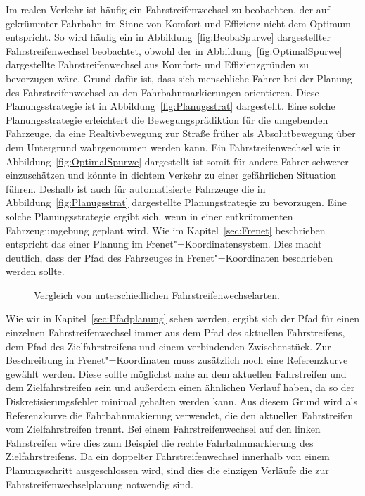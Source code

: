 Im realen Verkehr ist h\"aufig ein Fahrstreifenwechsel zu beobachten, der auf gekr\"ummter Fahrbahn im Sinne von Komfort und Effizienz nicht dem Optimum entspricht.
So wird h\"aufig ein in Abbildung~\ref{fig:BeobaSpurwe} dargestellter Fahrstreifenwechsel beobachtet, obwohl der in Abbildung~\ref{fig:OptimalSpurwe} dargestellte Fahrstreifenwechsel aus Komfort- und Effizienzgr\"unden zu bevorzugen w\"are.
Grund daf\"ur ist, dass sich menschliche Fahrer bei der Planung des Fahrstreifenwechsel an den Fahrbahnmarkierungen orientieren.
Diese Planungsstrategie ist in Abbildung~\ref{fig:Planugsstrat} dargestellt.
Eine solche Planungsstrategie erleichtert die Bewegungspr\"adiktion f\"ur die umgebenden Fahrzeuge, da eine Realtivbewegung zur Stra{\ss}e fr\"uher als Absolutbewegung \"uber dem Untergrund wahrgenommen werden kann.
Ein Fahrstreifenwechsel wie in Abbildung~\ref{fig:OptimalSpurwe} dargestellt ist somit f\"ur andere Fahrer schwerer einzusch\"atzen und k\"onnte in dichtem Verkehr zu einer gef\"ahrlichen Situation f\"uhren. 
Deshalb ist auch f\"ur automatisierte Fahrzeuge die in Abbildung~\ref{fig:Planugsstrat} dargestellte Planungstrategie zu bevorzugen.
Eine solche Planungsstrategie ergibt sich, wenn in einer entkr\"ummenten Fahrzeugumgebung geplant wird.
Wie im Kapitel~\ref{sec:Frenet} beschrieben entspricht das einer Planung im Frenet"=Koordinatensystem.
Dies macht deutlich, dass der Pfad des Fahrzeuges in Frenet"=Koordinaten beschrieben werden sollte. \cite{Werling2011}


\begin{figure}[!htbp]
    \centering
    \caption[Fahrstreifenwechsel in Frenet"=Koordinaten]{Vergleich von unterschiedlichen Fahrstreifenwechselarten. \cite{Werling2011}}
    \label{fig:SimSzen}
\end{figure}


Wie wir in Kapitel~\ref{sec:Pfadplanung} sehen werden, ergibt sich der Pfad f\"ur einen einzelnen Fahrstreifenwechsel immer aus dem Pfad des aktuellen Fahrstreifens, dem Pfad des Zielfahrstreifens und einem verbindenden Zwischenst\"uck.
Zur Beschreibung in Frenet"=Koordinaten muss zus\"atzlich noch eine Referenzkurve gew\"ahlt werden.
Diese sollte m\"oglichst nahe an dem aktuellen Fahrstreifen und dem Zielfahrstreifen sein und au{\ss}erdem einen \"ahnlichen Verlauf haben, da so der Diskretisierungsfehler minimal gehalten werden kann.
Aus diesem Grund wird als Referenzkurve die Fahrbahnmakierung verwendet, die den aktuellen Fahrstreifen vom Zielfahrstreifen trennt.
Bei einem Fahrstreifenwechsel auf den linken Fahrstreifen w\"are dies zum Beispiel die rechte Fahrbahnmarkierung des Zielfahrstreifens.
Da ein doppelter Fahrstreifenwechsel innerhalb von einem Planungsschritt ausgeschlossen wird, sind dies die einzigen Verl\"aufe die zur Fahrstreifenwechselplanung notwendig sind.

